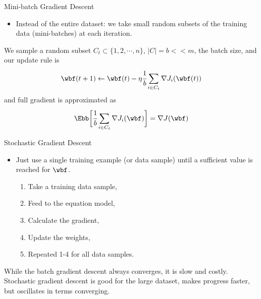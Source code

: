 \documentclass[aspectratio=169,xcolor=dvipsnames,svgnames,x11names,fleqn]{beamer}
\begin{document}
\begin{frame}{Mini-batch Gradient Descent}

\begin{itemize}
    \item Instead of the entire dataset: we take small random subsets of the training data (mini-batches) at each iteration.
\end{itemize}
We sample a random subset $C_t \subset \{1, 2, \cdots, n\}$, $|C| = b << m$, the batch size, and our update rule is
\begin{equation}
    \wbf(t+1) \leftarrow \wbf(t) -\eta \cfrac{1}{b}\sum_{i \in C_t}\nabla J_i(\wbf(t))
\end{equation}
and full gradient is approximated as
\begin{equation}
    \Ebb\bigg[ \cfrac{1}{b} \sum_{i \in C_t}\nabla J_i(\wbf)\bigg] = \nabla J(\wbf)
\end{equation}
\end{frame}
\begin{frame}{Stochastic Gradient Descent}

\begin{itemize}
    \item Just use a single training example (or data sample) until a sufficient value is reached for $\wbf$.
    \begin{enumerate}
        \item Take a training data sample, 
        \item Feed to the equation model,
        \item Calculate the gradient,
        \item Update the weights,
        \item Repeated 1-4 for all data samples.
    \end{enumerate}
\end{itemize}

\begin{talert}{}
While the batch gradient descent always converges, it is slow and costly. Stochastic gradient descent is good for the large dataset, makes progress faster, but oscillates in terms converging.
\end{talert}
\end{frame}
\end{document}
